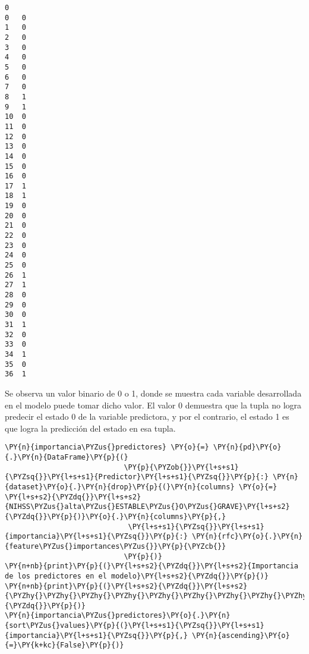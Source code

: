             \begin{tcolorbox}[breakable, size=fbox, boxrule=.5pt, pad at break*=1mm, opacityfill=0]
\begin{Verbatim}[commandchars=\\\{\}]
    0
0   0
1   0
2   0
3   0
4   0
5   0
6   0
7   0
8   1
9   1
10  0
11  0
12  0
13  0
14  0
15  0
16  0
17  1
18  1
19  0
20  0
21  0
22  0
23  0
24  0
25  0
26  1
27  1
28  0
29  0
30  0
31  1
32  0
33  0
34  1
35  0
36  1
\end{Verbatim}
\end{tcolorbox}
        
    Se observa un valor binario de 0 o 1, donde se muestra cada variable
desarrollada en el modelo puede tomar dicho valor. El valor 0 demuestra
que la tupla no logra predecir el estado 0 de la variable predictora, y
por el contrario, el estado 1 es que logra la predicción del estado en
esa tupla.

    \begin{tcolorbox}[breakable, size=fbox, boxrule=1pt, pad at break*=1mm,colback=cellbackground, colframe=cellborder]
\begin{Verbatim}[commandchars=\\\{\}]
\PY{n}{importancia\PYZus{}predictores} \PY{o}{=} \PY{n}{pd}\PY{o}{.}\PY{n}{DataFrame}\PY{p}{(}
                            \PY{p}{\PYZob{}}\PY{l+s+s1}{\PYZsq{}}\PY{l+s+s1}{Predictor}\PY{l+s+s1}{\PYZsq{}}\PY{p}{:} \PY{n}{dataset}\PY{o}{.}\PY{n}{drop}\PY{p}{(}\PY{n}{columns} \PY{o}{=} \PY{l+s+s2}{\PYZdq{}}\PY{l+s+s2}{NIHSS\PYZus{}alta\PYZus{}ESTABLE\PYZus{}O\PYZus{}GRAVE}\PY{l+s+s2}{\PYZdq{}}\PY{p}{)}\PY{o}{.}\PY{n}{columns}\PY{p}{,}
                             \PY{l+s+s1}{\PYZsq{}}\PY{l+s+s1}{importancia}\PY{l+s+s1}{\PYZsq{}}\PY{p}{:} \PY{n}{rfc}\PY{o}{.}\PY{n}{feature\PYZus{}importances\PYZus{}}\PY{p}{\PYZcb{}}
                            \PY{p}{)}
\PY{n+nb}{print}\PY{p}{(}\PY{l+s+s2}{\PYZdq{}}\PY{l+s+s2}{Importancia de los predictores en el modelo}\PY{l+s+s2}{\PYZdq{}}\PY{p}{)}
\PY{n+nb}{print}\PY{p}{(}\PY{l+s+s2}{\PYZdq{}}\PY{l+s+s2}{\PYZhy{}\PYZhy{}\PYZhy{}\PYZhy{}\PYZhy{}\PYZhy{}\PYZhy{}\PYZhy{}\PYZhy{}\PYZhy{}\PYZhy{}\PYZhy{}\PYZhy{}\PYZhy{}\PYZhy{}\PYZhy{}\PYZhy{}\PYZhy{}\PYZhy{}\PYZhy{}\PYZhy{}\PYZhy{}\PYZhy{}\PYZhy{}\PYZhy{}\PYZhy{}\PYZhy{}\PYZhy{}\PYZhy{}\PYZhy{}\PYZhy{}\PYZhy{}\PYZhy{}\PYZhy{}\PYZhy{}\PYZhy{}\PYZhy{}\PYZhy{}\PYZhy{}\PYZhy{}\PYZhy{}\PYZhy{}\PYZhy{}}\PY{l+s+s2}{\PYZdq{}}\PY{p}{)}
\PY{n}{importancia\PYZus{}predictores}\PY{o}{.}\PY{n}{sort\PYZus{}values}\PY{p}{(}\PY{l+s+s1}{\PYZsq{}}\PY{l+s+s1}{importancia}\PY{l+s+s1}{\PYZsq{}}\PY{p}{,} \PY{n}{ascending}\PY{o}{=}\PY{k+kc}{False}\PY{p}{)}
\end{Verbatim}
\end{tcolorbox}

